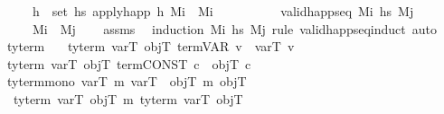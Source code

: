 \begin{isabellebody}
\ \ \ \ \ {\isachardoublequoteopen}{\isasymforall}h\ {\isasymin}\ set\ hs{\isachardot}{\kern0pt}\ apply{\isacharunderscore}{\kern0pt}happ\ h\ M\isactrlsub i\ {\isacharequal}{\kern0pt}\ M\isactrlsub i{\isachardoublequoteclose}\ \isanewline
\ \ \ \ \ \ \ \ \ {\isachardoublequoteopen}valid{\isacharunderscore}{\kern0pt}happ{\isacharunderscore}{\kern0pt}seq\ M\isactrlsub i\ hs\ M\isactrlsub j{\isachardoublequoteclose}\isanewline
\ \ \ \ \ {\isachardoublequoteopen}M\isactrlsub i\ {\isacharequal}{\kern0pt}\ M\isactrlsub j{\isachardoublequoteclose}\isanewline
%
\isadelimproof
\ \ %
\endisadelimproof
%
\isatagproof
{}\isamarkupfalse%
\ assms\ \isamarkupfalse%
\ {\isacharparenleft}{\kern0pt}induction\ M\isactrlsub i\ hs\ M\isactrlsub j\ rule{\isacharcolon}{\kern0pt}\ valid{\isacharunderscore}{\kern0pt}happ{\isacharunderscore}{\kern0pt}seq{\isachardot}{\kern0pt}induct{\isacharparenright}{\kern0pt}\ auto%
\endisatagproof
{\isafoldproof}%
%
\isadelimproof
\isanewline
%
\endisadelimproof
\isanewline
{}\isamarkupfalse%
\ %
%
\isadelimdocument
%
\endisadelimdocument
%
\isatagdocument
%
\isamarkuptrue%
%
\endisatagdocument
{\isafolddocument}%
%
\isadelimdocument
%
\endisadelimdocument
{}\isamarkupfalse%
\ ty{\isacharunderscore}{\kern0pt}term\ \isanewline
\ \ {\isachardoublequoteopen}ty{\isacharunderscore}{\kern0pt}term\ varT\ objT\ {\isacharparenleft}{\kern0pt}term{\isachardot}{\kern0pt}VAR\ v{\isacharparenright}{\kern0pt}\ {\isacharequal}{\kern0pt}\ varT\ v{\isachardoublequoteclose}\isanewline
{\isacharbar}{\kern0pt}\ {\isachardoublequoteopen}ty{\isacharunderscore}{\kern0pt}term\ varT\ objT\ {\isacharparenleft}{\kern0pt}term{\isachardot}{\kern0pt}CONST\ c{\isacharparenright}{\kern0pt}\ {\isacharequal}{\kern0pt}\ objT\ c{\isachardoublequoteclose}\isanewline
\isanewline
\isanewline
{}\isamarkupfalse%
\ ty{\isacharunderscore}{\kern0pt}term{\isacharunderscore}{\kern0pt}mono{\isacharcolon}{\kern0pt}\ {\isachardoublequoteopen}varT\ {\isasymsubseteq}\isactrlsub m\ varT{\isacharprime}{\kern0pt}\ {\isasymLongrightarrow}\ objT\ {\isasymsubseteq}\isactrlsub m\ objT{\isacharprime}{\kern0pt}\ {\isasymLongrightarrow}\isanewline
\ \ ty{\isacharunderscore}{\kern0pt}term\ varT\ objT\ {\isasymsubseteq}\isactrlsub m\ ty{\isacharunderscore}{\kern0pt}term\ varT{\isacharprime}{\kern0pt}\ objT{\isacharprime}{\kern0pt}{\isachardoublequoteclose}\isanewline

\end{isabellebody}
